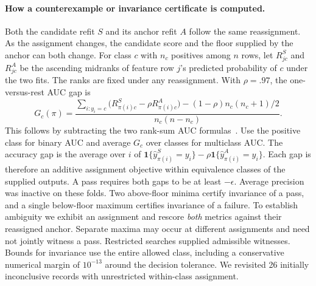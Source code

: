 \paragraph{How a counterexample or invariance certificate is computed.}
Both the candidate refit $S$ and its anchor refit $A$ follow the same reassignment. As the assignment changes, the candidate score and the floor supplied by the anchor can both change. For class $c$ with $n_c$ positives among $n$ rows, let $R^S_{jc}$ and $R^A_{jc}$ be the ascending midranks of feature row $j$'s predicted probability of $c$ under the two fits. The ranks are fixed under any reassignment. With $\rho=.97$, the one-versus-rest AUC gap is
\begin{equation}
 G_c(\pi)=
 \frac{\sum_{i:y_i=c}\!\big(R^S_{\pi(i)c}-\rho R^A_{\pi(i)c}\big)
       -(1-\rho)n_c(n_c+1)/2}{n_c(n-n_c)}.
 \label{eq:assignmentgap}
\end{equation}
This follows by subtracting the two rank-sum AUC formulas~\cite{bamber1975area}. Use the positive class for binary AUC and average $G_c$ over classes for multiclass AUC. The accuracy gap is the average over $i$ of $\mathbf 1\{\hat y^S_{\pi(i)}=y_i\}-\rho\mathbf 1\{\hat y^A_{\pi(i)}=y_i\}$. Each gap is therefore an additive assignment objective within equivalence classes of the supplied outputs. A pass requires both gaps to be at least $-\epsilon$. Average precision was inactive on these folds. Two above-floor minima certify invariance of a pass, and a single below-floor maximum certifies invariance of a failure. To establish ambiguity we exhibit an assignment and rescore \emph{both} metrics against their reassigned anchor. Separate maxima may occur at different assignments and need not jointly witness a pass. Restricted searches supplied admissible witnesses. Bounds for invariance use the entire allowed class, including a conservative numerical margin of $10^{-13}$ around the decision tolerance. We revisited 26 initially inconclusive records with unrestricted within-class assignment.
